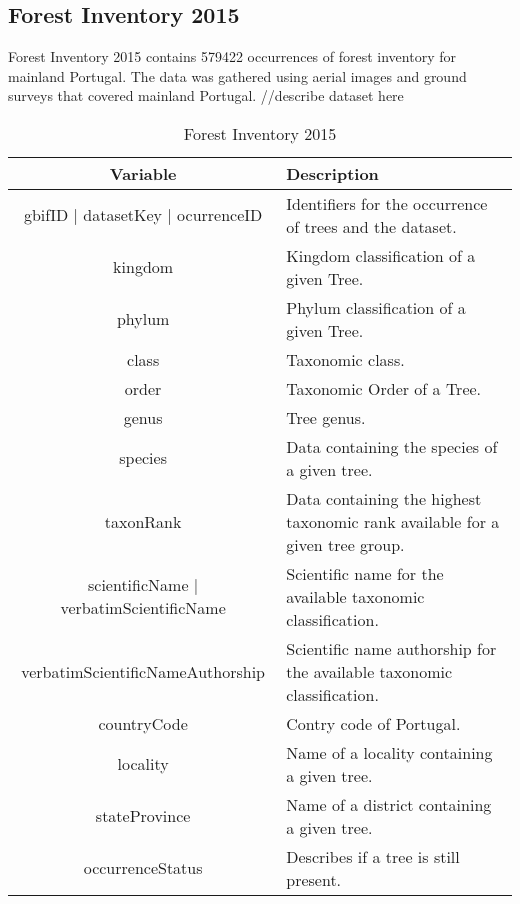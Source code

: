 \subsection{Forest Inventory 2015 \cite{uva2021forestry,https://doi.org/10.15468/dl.zwfmbt}}
Forest Inventory 2015 contains 579422 occurrences of forest inventory for mainland Portugal. The data was gathered using aerial images and ground surveys that covered mainland Portugal. 
//describe dataset here


\begin{table}[h!]
\caption{Forest Inventory 2015}
\label{forest_inventory}
\centering
\small
\begin{tabular}{|c|p{7.5cm}|} %
\hline
\textbf{Variable} & \textbf{Description}\\
\hline
gbifID | datasetKey | ocurrenceID  & Identifiers for the occurrence of trees and the dataset. \\
\hline
kingdom & Kingdom classification of a given Tree. \\
\hline
phylum & Phylum classification of a given Tree. \\
\hline
class & Taxonomic class. \\
\hline
order & Taxonomic Order of a Tree. \\
\hline
genus & Tree genus. \\
\hline
species & Data containing the species of a given tree. \\
\hline
taxonRank & Data containing the highest taxonomic rank available for a given tree group. \\
\hline
scientificName | verbatimScientificName & Scientific name for the available taxonomic classification. \\
\hline

verbatimScientificNameAuthorship & Scientific name authorship for the available taxonomic classification. \\
\hline

countryCode & Contry code of Portugal. \\
\hline

locality & Name of a locality containing a given tree. \\
\hline

stateProvince &  Name of a district containing a given tree. \\
\hline

occurrenceStatus & Describes if a tree is still present.   \\
\hline


\end{tabular}
\end{table}
